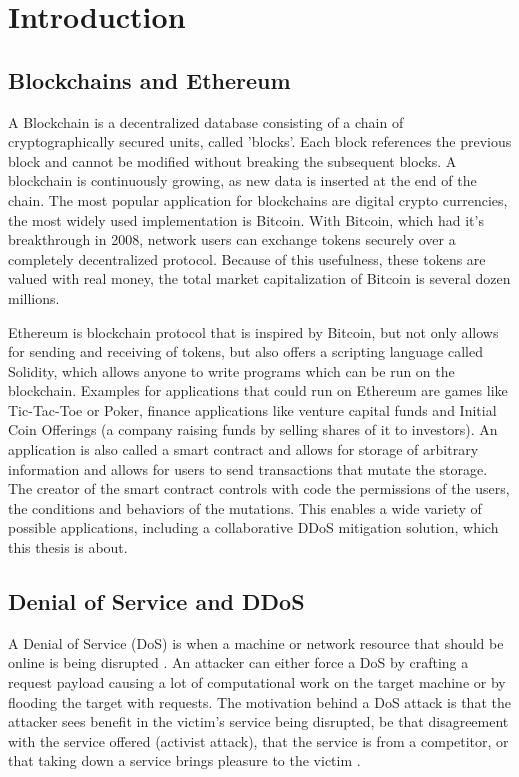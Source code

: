\chapter{Introduction}

\section{Blockchains and Ethereum}

A Blockchain is a decentralized database consisting of a chain of cryptographically secured units, called 'blocks'. Each block references the previous block and cannot be modified without breaking the subsequent blocks. A blockchain is continuously growing, as new data is inserted at the end of the chain.
The most popular application for blockchains are digital crypto currencies, the most widely used implementation is Bitcoin. With Bitcoin, which had it's breakthrough in 2008, network users can exchange tokens securely over a completely decentralized protocol. Because of this usefulness, these tokens are valued with real money, the total market capitalization of Bitcoin is several dozen millions.
 
Ethereum \cite{Ethereum} is blockchain protocol that is inspired by Bitcoin, but not only allows for sending and receiving of tokens, but also offers a scripting language called Solidity, which allows anyone to write programs which can be run on the blockchain. Examples for applications that could run on Ethereum are games like Tic-Tac-Toe or Poker, finance applications like venture capital funds and Initial Coin Offerings (a company raising funds by selling shares of it to investors).
An application is also called a smart contract and allows for storage of arbitrary information and allows for users to send transactions that mutate the storage. The creator of the smart contract controls with code the permissions of the users, the conditions and behaviors of the mutations. This enables a wide variety of possible applications, including a collaborative DDoS mitigation solution, which this thesis is about.

\section{Denial of Service and DDoS}

A Denial of Service (DoS) is when a machine or network resource that should be online is being disrupted \cite{USCERT}. An attacker can either force a DoS by crafting a request payload causing a lot of computational work on the target machine or by flooding the target with requests. The motivation behind a DoS attack is that the attacker sees benefit in the victim's service being disrupted, be that disagreement with the service offered (activist attack), that the service is from a competitor, or that taking down a service brings pleasure to the victim \cite{DDoSOverview}.

